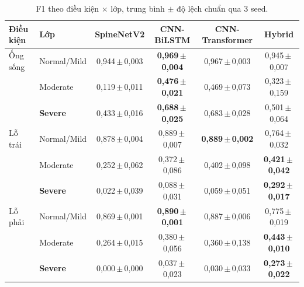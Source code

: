\documentclass[11pt,a4paper]{article}
\begin{document}
\begin{table}[htbp]\centering\small
\caption{F1 theo điều kiện $\times$ lớp, trung bình $\pm$ độ lệch chuẩn qua 3 seed.}
\label{tab:sota-f1}
\setlength{\tabcolsep}{4pt}
\begin{tabular}{llcccc}\toprule
\textbf{Điều kiện} & \textbf{Lớp} & \textbf{SpineNetV2} & \textbf{CNN-BiLSTM} & \textbf{CNN-Transformer} & \textbf{Hybrid} \\\midrule
Ống sống & Normal/Mild & 0{,}944\,$\pm$\,0{,}003 & \textbf{0{,}969\,$\pm$\,0{,}004} & 0{,}967\,$\pm$\,0{,}003 & 0{,}945\,$\pm$\,0{,}007 \\
 & Moderate & 0{,}119\,$\pm$\,0{,}011 & \textbf{0{,}476\,$\pm$\,0{,}021} & 0{,}469\,$\pm$\,0{,}073 & 0{,}323\,$\pm$\,0{,}159 \\
 & \textbf{Severe} & 0{,}433\,$\pm$\,0{,}016 & \textbf{0{,}688\,$\pm$\,0{,}025} & 0{,}683\,$\pm$\,0{,}028 & 0{,}501\,$\pm$\,0{,}064 \\
\midrule
Lỗ trái & Normal/Mild & 0{,}878\,$\pm$\,0{,}004 & 0{,}889\,$\pm$\,0{,}007 & \textbf{0{,}889\,$\pm$\,0{,}002} & 0{,}764\,$\pm$\,0{,}032 \\
 & Moderate & 0{,}252\,$\pm$\,0{,}062 & 0{,}372\,$\pm$\,0{,}086 & 0{,}402\,$\pm$\,0{,}098 & \textbf{0{,}421\,$\pm$\,0{,}042} \\
 & \textbf{Severe} & 0{,}022\,$\pm$\,0{,}039 & 0{,}088\,$\pm$\,0{,}031 & 0{,}059\,$\pm$\,0{,}051 & \textbf{0{,}292\,$\pm$\,0{,}017} \\
\midrule
Lỗ phải & Normal/Mild & 0{,}869\,$\pm$\,0{,}001 & \textbf{0{,}890\,$\pm$\,0{,}001} & 0{,}887\,$\pm$\,0{,}006 & 0{,}775\,$\pm$\,0{,}019 \\
 & Moderate & 0{,}264\,$\pm$\,0{,}015 & 0{,}380\,$\pm$\,0{,}056 & 0{,}360\,$\pm$\,0{,}138 & \textbf{0{,}443\,$\pm$\,0{,}010} \\
 & \textbf{Severe} & 0{,}000\,$\pm$\,0{,}000 & 0{,}037\,$\pm$\,0{,}023 & 0{,}030\,$\pm$\,0{,}033 & \textbf{0{,}273\,$\pm$\,0{,}022} \\
\bottomrule\end{tabular}\end{table}
\end{document}
